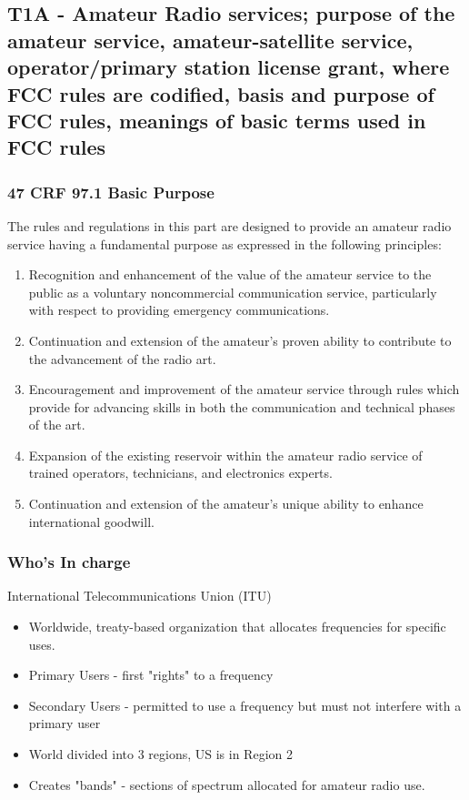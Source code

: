 \documentclass[12pt,letterpaper]{beamer}
\begin{document}
\subsection{T1A - Amateur Radio services; purpose of the amateur service, amateur-satellite service, operator/primary station license grant, where FCC rules are codified, basis and purpose of FCC rules, meanings of basic terms used in FCC rules}
\begin{frame}
\frametitle{47 CRF 97.1 Basic Purpose}
The rules and regulations in this part are designed to provide an amateur radio service having a fundamental purpose as expressed in the following principles:
\begin{enumerate}[A]
\scriptsize\item  Recognition and enhancement of the value of the amateur service to the public as a voluntary noncommercial communication service, particularly with respect to providing emergency communications.\pause
\item Continuation and extension of the amateur's proven ability to contribute to the advancement of the radio art.\pause
\item Encouragement and improvement of the amateur service through rules which provide for advancing skills in both the communication and technical phases of the art.\pause
\item  Expansion of the existing reservoir within the amateur radio service of trained operators, technicians, and electronics experts. \pause
\item Continuation and extension of the amateur's unique ability to enhance international goodwill.
\end{enumerate}
\end{frame}

\begin{frame}
\frametitle{Who's In charge}
International Telecommunications Union (ITU)
\begin{itemize}
\item Worldwide, treaty-based organization that allocates frequencies for specific uses.
\item Primary Users - first "rights" to a frequency
\item Secondary Users - permitted to use a frequency but must not interfere with a primary user
\item World divided into 3 regions, US is in Region 2
\item Creates "bands" - sections of spectrum allocated for amateur radio use.
\end{itemize}
\end{frame}
\end{document}
